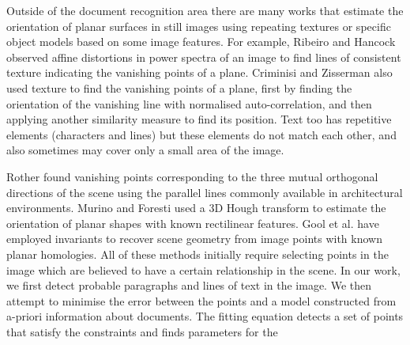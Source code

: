 \documentclass{elsart}   %
\begin{document}
Outside of the document recognition area there are  many works that
estimate the orientation of planar surfaces in still images 
using  repeating textures or specific object models based on some image features.
For example, Ribeiro and Hancock \cite{ribeiro}
observed affine distortions in power spectra of an image to find lines of
consistent texture indicating the vanishing points of a plane. Criminisi and
Zisserman \cite{zisserman} also used texture to find the vanishing points of a
plane,  first by finding the orientation of the vanishing line with normalised
auto-correlation, and then applying another similarity measure to find its position.
Text too has repetitive elements (characters and lines) but
these elements do not match each other, and also sometimes may cover only a
small area of the image.



Rother \cite{rother0} found vanishing points  corresponding  to the three mutual
orthogonal directions of the scene using the parallel lines commonly
available in architectural environments.
Murino and
Foresti \cite{MURIN} used a 3D Hough transform to estimate the orientation of
planar shapes with known rectilinear features.
Gool et al. \cite{vangool98planar} have employed invariants to recover scene geometry
from image points with known planar homologies.
All of these methods initially require selecting points in the image which are
believed to have a certain relationship in the scene.
In our work, we first detect probable paragraphs and lines of text in the image.
We then attempt to minimise the error between the points and a model constructed from
a-priori information about documents.
The fitting equation detects a set of points that satisfy the constraints
and finds parameters for the 
\end{document}
